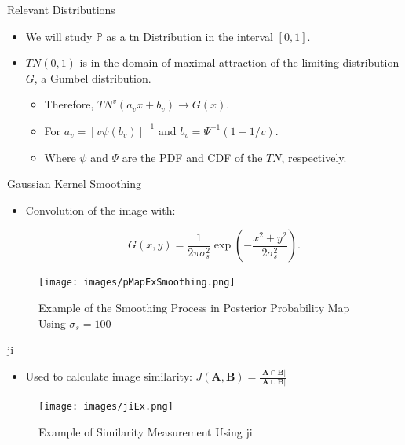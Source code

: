 \documentclass{beamer}
\begin{document}

\begin{frame}{Relevant Distributions}
\begin{itemize}
\item We will study $\bm{\mathbb{P}}$ as a \acrfull{tn} Distribution 
in the interval $[0,1]$.
\item $TN(0,1)$ is in the domain of maximal attraction of the limiting 
distribution $G$, a Gumbel distribution.
\begin{itemize}
\item Therefore, $TN^v(a_vx+b_v) \rightarrow G(x)$.
\item For $a_v = \left[ v \psi (b_v) \right]^{-1}$ and $b_v = \Psi^{-1}(1-1/v)$.
\item Where $\psi$ and $\Psi$ are the PDF and CDF of the $TN$, respectively.
\end{itemize}
\end{itemize}
\end{frame}

\begin{frame}{Gaussian Kernel Smoothing}
\begin{itemize}
\item Convolution of the image with:

$$G(x,y) = \frac{1}{2\pi\sigma_{s}^2} \exp \left( -\frac{x^2+y^2}{2\sigma_{s}^2} \right).$$

\end{itemize}
\begin{figure}
\centering
\texttt{[image: images/pMapExSmoothing.png]}
\caption{Example of the Smoothing Process in Posterior Probability Map Using $\sigma_{s}=100$}
\end{figure}
\end{frame}

\begin{frame}{\acrfull{ji}}
\begin{itemize}
\item Used to calculate image similarity: $ J(\bm{A},\bm{B}) = \frac{|\bm{A} \cap \bm{B}|}{|\bm{A} \cup \bm{B}|} $

\end{itemize}
\begin{figure}
\centering
\texttt{[image: images/jiEx.png]}
\caption{Example of Similarity Measurement Using \acrshort{ji}}
\end{figure}
\end{frame}
\end{document}
